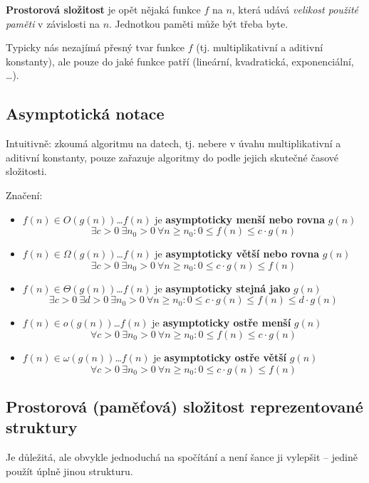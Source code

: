 \documentclass[11pt]{report} %
\numberwithin{equation}{section}
\begin{document}
\textbf{Prostorová složitost} je opět nějaká funkce $f$ na $n$, která udává \textit{velikost použité paměti} v závislosti na $n$. Jednotkou paměti může být třeba byte.

Typicky nás nezajímá přesný tvar funkce $f$ (tj. multiplikativní a aditivní konstanty), ale pouze do jaké 
 funkce patří (lineární, kvadratická, exponenciální, \dots). 

\subsection{Asymptotická notace}
Intuitivně: zkoumá  algoritmu na  datech, tj. nebere v úvahu multiplikativní a aditivní konstanty, pouze zařazuje algoritmy do  podle jejich skutečné časové složitosti.

Značení:
\begin{itemize}
	\item $f(n) \in O(g(n))$\quad \dots\quad $f(n)$ je \textbf{asymptoticky menší nebo rovna} $g(n)$
	$$\exists c > 0\ \exists n_0 > 0\ \forall n \geq n_0 : 0 \leq f(n) \leq c \cdot g(n)$$
	\item $f(n) \in \Omega(g(n))$\quad \dots\quad $f(n)$ je \textbf{asymptoticky větší nebo rovna} $g(n)$
	$$\exists c > 0\ \exists n_0 > 0\ \forall n \geq n_0 : 0 \leq c \cdot g(n) \leq f(n)$$
	\item $f(n) \in \Theta(g(n))$\quad \dots\quad $f(n)$ je \textbf{asymptoticky stejná jako} $g(n)$
	$$\exists c > 0\ \exists d > 0\ \exists n_0 > 0\ \forall n \geq n_0 : 0 \leq c\cdot g(n) \leq f(n) \leq d \cdot g(n)$$	
	\item $f(n) \in o(g(n))$\quad \dots\quad $f(n)$ je \textbf{asymptoticky ostře menší} $g(n)$
	$$\forall c > 0\ \exists n_0 > 0\ \forall n \geq n_0 : 0 \leq f(n) \leq c \cdot g(n)$$	
	\item $f(n) \in \omega(g(n))$\quad \dots\quad $f(n)$ je \textbf{asymptoticky ostře větší} $g(n)$
	$$\forall c > 0\ \exists n_0 > 0\ \forall n \geq n_0 : 0 \leq c \cdot g(n) \leq f(n)$$	
\end{itemize}



\subsection{Prostorová (paměťová) složitost reprezentované struktury}
Je důležitá, ale obvykle jednoduchá na spočítání a není šance ji vylepšit -- jedině použít úplně
jinou strukturu. 
\end{document}
